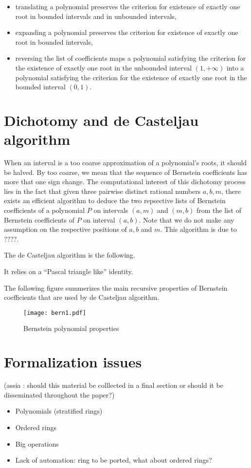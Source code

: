 \documentclass{article}
\begin{document}
\begin{itemize}
\item translating a polynomial preserves the criterion for existence
of exactly one root in bounded intervals and in unbounded intervals,
\item expanding a polynomial preserves the criterion for existence of
  exactly one root in bounded intervals,
\item reversing the list of coefficients maps a polynomial satisfying
  the criterion for the existence of exactly one root in the unbounded
  interval \((1,+\infty)\) into a polynomial satisfying the criterion
  for the existence of exactly one root in the bounded interval \((0,1)\).
\end{itemize}

\section{Dichotomy and de Casteljau algorithm}
\label{dichotomy}

When an interval is a too coarse approximation of a polynomial's
roots, it should be halved. By too coarse, we mean that the sequence
of Bernstein coefficients has more that one sign change. The
computational interest of this dichotomy process lies in the fact that
given three pairwise distinct rational numbers $a, b, m$, there exists an
efficient algorithm to deduce the two repsective lists of Bernstein
coefficients of a polynomial $P$ on intervals $(a, m)$ and $(m, b)$
from the list of Bernstein coefficients of $P$ on interval $(a,
b)$. Note that we do not make any assumption on the respective
positions of $a, b$ and $m$. This algorithm is due to ????.

The de Casteljau algorithm is the following.

It relies on a ``Pascal triangle like'' identity.


The following figure summerizes the main recursive properties of
Bernstein coefficients that are used by de Casteljau algorithm.
\begin{figure}\label{bern}
\begin{center}
\texttt{[image: bern1.pdf]}
\end{center}
\caption{Bernstein polynomial properties}
\end{figure}



\section{Formalization issues}

(assia : should this material be colllected in a final section or
should it be disseminated throughout the paper?)

\begin{itemize}
\item Polynomials (stratified rings)
\item Ordered rings
\item Big operations
\item Lack of automation: ring to be ported, what about ordered rings?
\end{itemize}
\end{document}
